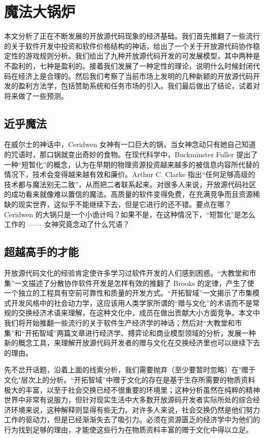 \section{魔法大锅炉}
本文分析了正在不断发展的开放源代码现象的经济基础。我们首先推翻了一些流行的关于软件开发中投资和软件价格结构的神话，给出了一个关于开放源代码协作稳定性的游戏规则分析。我们给出了九种开放源代码开发的可发展模型，其中两种是不盈利的，七种是盈利的。接着我们发展了一种定性的理论，说明什么时候封闭代码在经济上是合理的。然后我们考察了当前市场上发明的几种新颖的开放源代码开发的盈利方法学，包括赞助系统和任务市场的引入。我们最后做出了结论，试着对将来做了一些预测。

\subsection{近乎魔法}
在威尔士的神话中，Ceridwen 女神有一口巨大的锅，当女神念动只有她自己知道的咒语时，那口锅就变出奇妙的食物。在现代科学中，Buckminster Fuller 提出了一种“短暂化”的概念，认为在早期的物理资源投资越来越多的被信息内容所代替的情况下，技术会变得越来越有效和廉价。Arthur C. Clarke 指出“任何足够高级的技术都与魔法别无二致”，从而把二者联系起来。对很多人来说，开放源代码社区的成功看来就像难以置信的魔法。高质量的软件变得免费，在充满竞争而且资源稀缺的现实世界，这似乎不能继续下去，但是它进行的还不错。要点在哪？Ceridwen 的大锅只是一个小诡计吗？如果不是，在这种情况下，“短暂化”是怎么工作的 —— 女神究竟念动了什么咒语？

\subsection{超越高手的才能}
开放源代码文化的经验肯定使许多学习过软件开发的人们感到困惑。“大教堂和市集”一文描述了分散协作软件开发是怎样有效的推翻了 Brooks 的定律，产生了使一个独立的工程具有空前可靠性和质量的开发方式。“开拓智域”一文揭示了市集模式开发风格中的社会动力学，这应该用人类学家所谓的“赠与文化”的术语而不是常规的交换经济术语来理解，在这种文化中，成员在做出贡献大小方面竞争。本文中我们将开始推翻一些流行的关于软件生产经济学的神话；然后对“大教堂和市集”和“开拓智域”两篇文章进行经济学、搏弈论和商业模型领域的分析，发展一种新的概念工具，来理解开放源代码开发者的赠与文化在交换经济里也可以继续下去的理由。


先不岔开话题，沿着上面的线索分析，我们需要抛弃（至少要暂时忽略）在"赠于文化"层次上的分析。“开拓智域”中赠于文化的存在是基于生存所需要的物质资料极大的丰富，以至于社会交换已经不很重要的环境里；这种分析虽然在纯粹的精神世界中非常有说服力，但针对现实生活中大多数开放源码开发者实际所处的综合经济环境来说，这种解释则显得有些无力。对许多人来说，社会交换仍然是他们努力工作的驱动力，但是已经渐渐失去了吸引力。必须在资源匮乏的经济学中为他们的行为找到足够的理由，才能使这些行为在物质资料丰富的赠于文化中得以立足。


